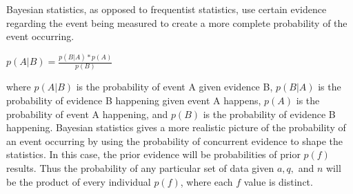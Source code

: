 \documentclass[]{minimal}
\begin{document}
\par Bayesian statistics, as opposed to frequentist statistics, use certain evidence regarding the event being measured to create a more complete probability of the event occurring. \par \begin{center} $p(A|B) = \frac{p(B|A)*p(A)}{p(B)} $ \end{center}  \par where $p(A|B)$ is the probability of event A given evidence B, $p(B|A)$ is the probability of evidence B happening given event A happens, $p(A)$ is the probability of event A happening, and $p(B)$ is the probability of evidence B happening. Bayesian statistics gives a more realistic picture of the probability of an event occurring by using the probability of concurrent evidence to shape the statistics.  In this case, the prior evidence will be probabilities of prior $p(f)$ results. Thus the probability of any particular set of data given $a,q,$ and $n$ will be the product of every individual $p(f)$, where each $f$ value is distinct. 
\end{document}
